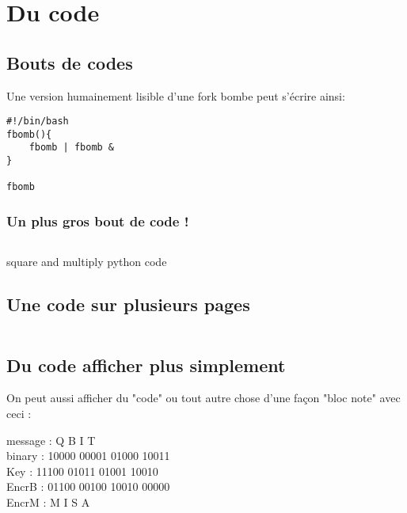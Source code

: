 \section{Du code}
\subsection{Bouts de codes}
Une version humainement lisible d'une fork bombe peut s'écrire ainsi:
\begin{verbatim}
#!/bin/bash
fbomb(){
    fbomb | fbomb &
}

fbomb
\end{verbatim}

\subsubsection{Un plus gros bout de code !}
\begin{listing}[H]
    \inputminted{python}{src/parts/code/example.py}
    \caption{square and multiply python code}
    \label{cd:square_and_mult}
\end{listing}

\subsection{Une code sur plusieurs pages}
\inputminted{python}{src/parts/code/example2.py}

\subsection{Du code afficher plus simplement}

On peut aussi afficher du "code" ou tout autre chose d'une façon "bloc note" avec ceci :
\begin{mycodebox}
    message :  Q     B     I     T \\
    binary : 10000 00001 01000 10011 \\
    Key :    11100 01011 01001 10010 \\
    EncrB :  01100 00100 10010 00000 \\
    EncrM :    M     I     S     A
\end{mycodebox}


